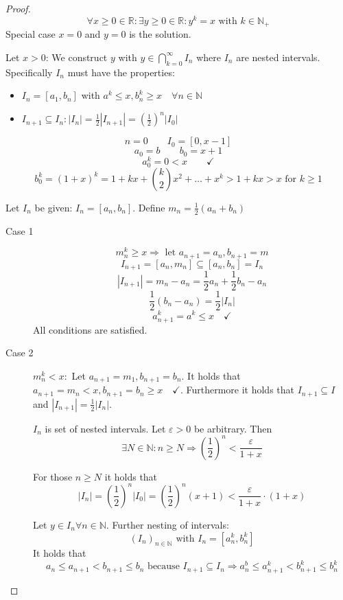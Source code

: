 \documentclass[a4paper,landscape,twocolumn]{article}
\theoremstyle{definition}
\newcommand\abs[1]{\left|#1\right|}
\begin{document}
\begin{proof}
  \[ \forall x \geq 0 \in \mathbb R: \exists y \geq 0 \in \mathbb R: y^k = x \text{ with } k \in \mathbb N_+ \]
  Special case $x = 0$ and $y = 0$ is the solution.

  Let $x > 0$: We construct $y$ with $y \in \bigcap_{k=0}^\infty I_n$
  where $I_n$ are nested intervals.
  Specifically $I_n$ must have the properties:
  \begin{itemize}
    \item $I_n = [a_1, b_n]$ with $a^k \leq x, b_n^k \geq x \quad \forall n \in \mathbb N$
    \item $I_{n+1} \subseteq I_n: \abs{I_n} = \frac12 \abs{I_{n+1}} = \left(\frac12\right)^n \abs{I_0}$
  \end{itemize}

  \[ n = 0 \qquad I_0 = [0, x-1] \]
  \[ a_0 = b \qquad b_0 = x + 1 \]
  \[ a_0^k = 0 < x \qquad\checkmark \]
  \[ b_0^k = (1 + x)^k = 1 + kx + \binom k2 x^2 + \dots + x^k > 1 + kx > x \text{ for } k \geq 1 \]

  Let $I_n$ be given: $I_n = [a_n, b_n]$.
  Define $m_n = \frac12 (a_n + b_n)$
  \begin{description}
    \item[Case 1]
      \[ m_n^k \geq x \Rightarrow \text{ let } a_{n+1} = a_n, b_{n+1} = m \]
      \[ I_{n+1} = [a_n, m_n] \subseteq [a_n, b_n] = I_n \]
      \[ \abs{I_{n+1}} = m_n - a_n = \frac12 a_n + \frac12 b_n - a_n \]
      \[ \frac12 (b_n - a_n) = \frac12 \abs{I_n} \]
      \[ a_{n+1}^k = a^k \leq x \quad\checkmark \]
      All conditions are satisfied.
    \item[Case 2] $m_n^k < x: $
      Let $a_{n+1} = m_1, b_{n+1} = b_n$.
      It holds that $a_{n+1} = m_n < x, b_{n+1} = b_n \geq x \quad\checkmark$.
      Furthermore it holds that $I_{n+1} \subseteq I$ and $\abs{I_{n+1}} = \frac12 \abs{I_n}$.

      $I_n$ is set of nested intervals.
      Let $\varepsilon > 0$ be arbitrary. Then
      \[ \exists N \in \mathbb N: n \geq N \Rightarrow \left(\frac12\right)^n < \frac{\varepsilon}{1 + x} \]

      For those $n \geq N$ it holds that
      \[
          \abs{I_n} = \left(\frac12\right)^n \abs{I_{0}}
          = \left(\frac12\right)^n (x + 1)
          < \frac{\varepsilon}{1 + x} \cdot (1 + x)
      \]

      Let $y \in I_n \forall n \in \mathbb N$.
      Further nesting of intervals:
      \[ (I_n)_{n \in \mathbb N} \text{ with } I_n = [a_n^k, b_n^k] \]
      It holds that
      \[
          a_n \leq a_{n+1} < b_{n+1} \leq b_n \text{ because } I_{n+1} \subseteq I_n
          \Rightarrow a_n^b \leq a_{n+1}^k < b_{n+1}^k \leq b_n^k
      \]


\end{description}
\end{proof}
\end{document}
